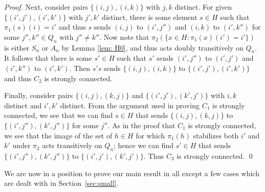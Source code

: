 \documentclass{llncs}
\begin{document}
\begin{proof}
Next, consider pairs $\{(i,j), (i,k)\}$ with $j,k$ distinct.  For given $\{(i',j'),(i',k')\}$ with $j',k'$ distinct, there is some element $s\in H$ such that $\pi_1(s)(i)=i'$ and thus $s$ sends
$(i,j)$ to $(i',j'')$ and $(i,k)$ to $(i',k'')$ for some $j'',k''\in Q_n$ with $j''\neq k''$.  Now note that $\pi_2(\{x\in H\colon\pi_1(x)(i')=i'\})$ is either $S_n$ or $A_n$ by Lemma \ref{lem: H0}, and thus acts doubly transitively on $Q_n$.  It follows that there is some $s'\in H$ such that
$s'$ sends $(i',j'')$ to $(i',j')$ and $(i',k'')$ to $(i',k')$.  Then $s's$ sends $\{(i,j), (i,k)\}$ to $\{(i',j'),(i',k')\}$ and thus $C_2$ is strongly connected.

Finally, consider pairs $\{(i,j), (k,j)\}$ and $\{(i',j'),(k',j')\}$ with $i,k$ distinct and $i',k'$ distinct.  From the argument used in proving $C_1$ is strongly connected, we see that we can find $s\in H$ that sends
$\{(i,j), (k,j)\}$ to $\{(i',j''), (k',j'')\}$ for some $j''$.  As in the proof that $C_1$ is strongly connected,  we see that the image of the set of $h\in H$ for which $\pi_1(h)$ stabilizes both $i'$ and $k'$ under $\pi_2$ acts transitively on $Q_n$; hence we can find $s'\in H$ that  sends $\{(i',j''), (k',j'')\}$ to $\{(i',j'),(k',j')\}$.  Thus $C_3$ is strongly connected.
\qed
\end{proof} 

We are now in a position to prove our main result in all except a few cases which are dealt with in Section~\ref{sec:small}.
\end{document}
